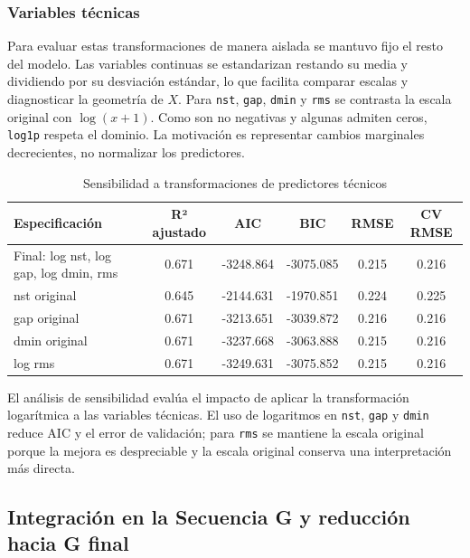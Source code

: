 \documentclass{style}
\newcommand{\var}[1]{\texttt{#1}}
\begin{document}
\subsubsection{Variables técnicas}

Para evaluar estas transformaciones de manera aislada se mantuvo fijo el resto del modelo. Las variables continuas se estandarizan restando su media y dividiendo por su desviación estándar, lo que facilita comparar escalas y diagnosticar la geometría de $X$. Para \var{nst}, \var{gap}, \var{dmin} y \var{rms} se contrasta la escala original con $\log(x+1)$. Como son no negativas y algunas admiten ceros, \texttt{log1p} respeta el dominio. La motivación es representar cambios marginales decrecientes, no normalizar los predictores.


\begin{table}[H]
    \centering
    \caption{Sensibilidad a transformaciones de predictores técnicos}
    \scriptsize
    \setlength{\tabcolsep}{10pt} 
    \begin{tabular}{lccccc}
    \toprule
    \textbf{Especificación} & \textbf{R² ajustado} & \textbf{AIC} & \textbf{BIC} & \textbf{RMSE} & \textbf{CV RMSE} \\
    \midrule
    Final: log nst, log gap, log dmin, rms & 0.671 & -3248.864 & -3075.085 & 0.215 & 0.216 \\
    nst original & 0.645 & -2144.631 & -1970.851 & 0.224 & 0.225 \\
    gap original & 0.671 & -3213.651 & -3039.872 & 0.216 & 0.216 \\
    dmin original & 0.671 & -3237.668 & -3063.888 & 0.215 & 0.216 \\
    log rms & 0.671 & -3249.631 & -3075.852 & 0.215 & 0.216 \\
    \bottomrule
    \end{tabular}
\end{table}


El análisis de sensibilidad evalúa el impacto de aplicar la transformación logarítmica a las variables técnicas. El uso de logaritmos en \var{nst}, \var{gap} y \var{dmin} reduce AIC y el error de validación; para \var{rms} se mantiene la escala original porque la mejora es despreciable y la escala original conserva una interpretación más directa.


\subsection{Integración en la Secuencia G y reducción hacia G final}
\end{document}
